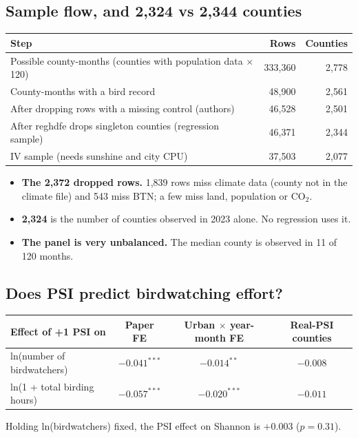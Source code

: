 \documentclass[11pt]{article}
\begin{document}
\subsection{Sample flow, and 2,324 vs 2,344 counties}
\begin{center}
\small
\begin{tabular}{l r r}
\toprule
Step & Rows & Counties \\
\midrule
Possible county-months (counties with population data $\times$ 120) & 333,360 & 2,778 \\
County-months with a bird record & 48,900 & 2,561 \\
After dropping rows with a missing control (authors) & 46,528 & 2,501 \\
After reghdfe drops singleton counties (regression sample) & 46,371 & 2,344 \\
IV sample (needs sunshine and city CPU) & 37,503 & 2,077 \\
\bottomrule
\end{tabular}
\end{center}
\begin{itemize}
\item \textbf{The 2,372 dropped rows.} 1,839 rows miss climate data (county not in the climate file) and 543 miss BTN; a few miss land, population or CO$_2$.
\item \textbf{2,324} is the number of counties observed in 2023 alone. No regression uses it.
\item \textbf{The panel is very unbalanced.} The median county is observed in 11 of 120 months.
\end{itemize}

\subsection{Does PSI predict birdwatching effort?}
\begin{center}
\small
\begin{tabular}{l c c c}
\toprule
Effect of +1 PSI on & Paper FE & Urban $\times$ year-month FE & Real-PSI counties \\
\midrule
ln(number of birdwatchers) & $-0.041^{***}$ & $-0.014^{**}$ & $-0.008$ \\
ln(1 + total birding hours) & $-0.057^{***}$ & $-0.020^{***}$ & $-0.011$ \\
\bottomrule
\end{tabular}
\end{center}
Holding ln(birdwatchers) fixed, the PSI effect on Shannon is $+0.003$ ($p=0.31$).
\end{document}
